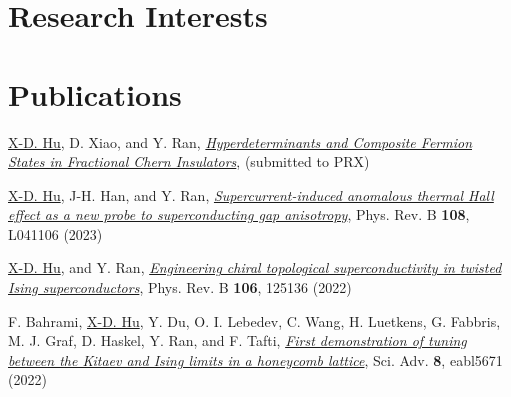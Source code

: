 \documentclass{article}
\renewenvironment{itemize}{
  \begin{list}{}{
    \setlength{\leftmargin}{1.5em}
  }
}{
  \end{list}
}
\begin{document}
\section*{Research Interests}

\section*{Publications}
\begin{itemize}
    \item \underline{X-D. Hu}, D. Xiao, and Y. Ran, \href{???}{\emph{Hyperdeterminants and Composite Fermion States in Fractional Chern Insulators}},  (submitted to PRX)
    \item \underline{X-D. Hu}, J-H. Han, and Y. Ran, \href{https://journals.aps.org/prb/abstract/10.1103/PhysRevB.108.L041106}{\emph{Supercurrent-induced anomalous thermal Hall effect as a new probe to superconducting gap anisotropy}}, Phys. Rev. B {\bf 108}, L041106 (2023)
    \item \underline{X-D. Hu}, and Y. Ran, \href{https://journals.aps.org/prb/abstract/10.1103/PhysRevB.106.125136}{\emph{Engineering chiral topological superconductivity in twisted Ising superconductors}}, Phys. Rev. B {\bf 106}, 125136 (2022)
    \item F. Bahrami, \underline{X-D. Hu}, Y. Du, O. I. Lebedev, C. Wang, H. Luetkens, G. Fabbris, M. J. Graf, D. Haskel, Y. Ran, and F. Tafti, \href{https://www.science.org/doi/full/10.1126/sciadv.abl5671}{\emph{First demonstration of tuning between the Kitaev and Ising limits in a honeycomb lattice}}, Sci. Adv. {\bf 8}, eabl5671 (2022)
\end{itemize}
\end{document}
